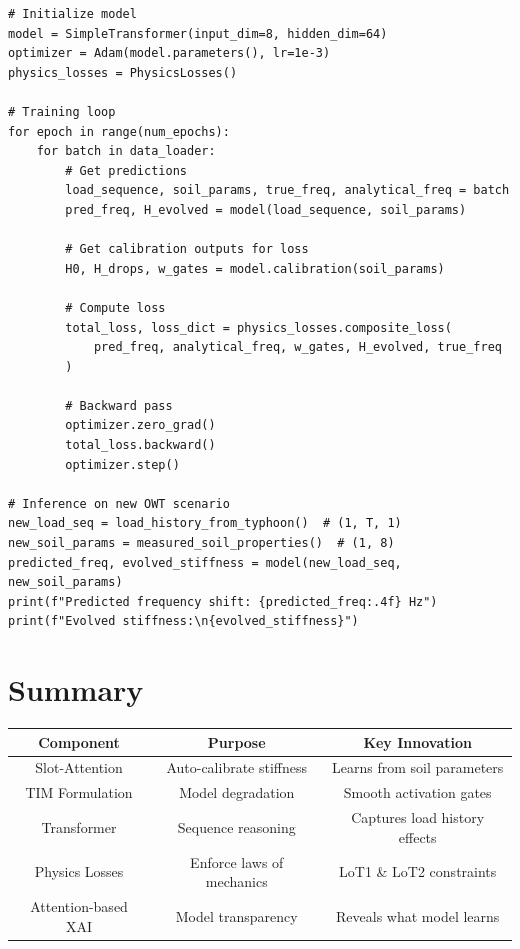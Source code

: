 \documentclass[11pt,a4paper]{article}
\begin{document}
\begin{lstlisting}
# Initialize model
model = SimpleTransformer(input_dim=8, hidden_dim=64)
optimizer = Adam(model.parameters(), lr=1e-3)
physics_losses = PhysicsLosses()

# Training loop
for epoch in range(num_epochs):
    for batch in data_loader:
        # Get predictions
        load_sequence, soil_params, true_freq, analytical_freq = batch
        pred_freq, H_evolved = model(load_sequence, soil_params)

        # Get calibration outputs for loss
        H0, H_drops, w_gates = model.calibration(soil_params)

        # Compute loss
        total_loss, loss_dict = physics_losses.composite_loss(
            pred_freq, analytical_freq, w_gates, H_evolved, true_freq
        )

        # Backward pass
        optimizer.zero_grad()
        total_loss.backward()
        optimizer.step()

# Inference on new OWT scenario
new_load_seq = load_history_from_typhoon()  # (1, T, 1)
new_soil_params = measured_soil_properties()  # (1, 8)
predicted_freq, evolved_stiffness = model(new_load_seq, new_soil_params)
print(f"Predicted frequency shift: {predicted_freq:.4f} Hz")
print(f"Evolved stiffness:\n{evolved_stiffness}")
\end{lstlisting}

\section{Summary}

\begin{table}[H]
\centering
\begin{tabular}{|c|c|c|}
\hline
\textbf{Component} & \textbf{Purpose} & \textbf{Key Innovation} \\
\hline
Slot-Attention & Auto-calibrate stiffness & Learns from soil parameters \\
\hline
TIM Formulation & Model degradation & Smooth activation gates \\
\hline
Transformer & Sequence reasoning & Captures load history effects \\
\hline
Physics Losses & Enforce laws of mechanics & LoT1 \& LoT2 constraints \\
\hline
Attention-based XAI & Model transparency & Reveals what model learns \\
\hline
\end{tabular}
\end{table}
\end{document}
